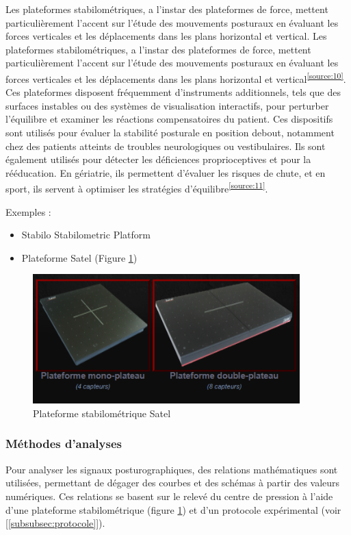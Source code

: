 Les plateformes stabilométriques, a l’instar des plateformes de force, mettent particulièrement l’accent sur l'étude des mouvements posturaux en évaluant les forces verticales et les déplacements dans les plans horizontal et vertical. 
Les plateformes stabilométriques, a l’instar des plateformes de force, mettent particulièrement l’accent sur l'étude des mouvements posturaux en évaluant les forces verticales et les déplacements dans les plans horizontal et vertical\textsuperscript{\ref{source:10}}. 
Ces plateformes disposent fréquemment d’instruments additionnels, tels que des surfaces instables ou des systèmes de visualisation interactifs, pour perturber l'équilibre et examiner les réactions compensatoires du patient. 
Ces dispositifs sont utilisés pour évaluer la stabilité posturale en position debout, notamment chez des patients atteints de troubles neurologiques ou vestibulaires. 
Ils sont également utilisés pour détecter les déficiences proprioceptives et pour la rééducation.
En gériatrie, ils permettent d'évaluer les risques de chute, et en sport, ils servent à optimiser les stratégies d'équilibre\textsuperscript{\ref{source:11}}. 

Exemples : 
\begin{itemize}
    \item Stabilo Stabilometric Platform 
    \item Plateforme  Satel (Figure \ref{fig:satel})
\end{itemize}

\begin{figure}[H]
    \centering
    \includegraphics[height=5cm]{images/pression_plantaire/satel.png}
    \caption{Plateforme stabilométrique Satel}\label{fig:satel}
\end{figure}
 
\subsubsection{Méthodes d’analyses}

Pour analyser les signaux posturographiques, des relations mathématiques sont utilisées, permettant de dégager des courbes et des schémas à partir des valeurs numériques. 
Ces relations se basent sur le relevé du centre de pression à l’aide d’une plateforme stabilométrique (figure \ref{fig:satel}) et d’un protocole expérimental (voir [\ref{subsubsec:protocole}]).

